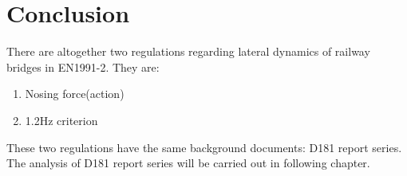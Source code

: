 \section{Conclusion}

There are altogether two regulations regarding lateral dynamics of railway bridges in EN1991-2. They are:

\begin{enumerate}
	\item Nosing force(action)
	\item 1.2Hz criterion 
\end{enumerate}

These two regulations have the same background documents: D181 report series. The analysis of D181 report series will be carried out in following chapter.






